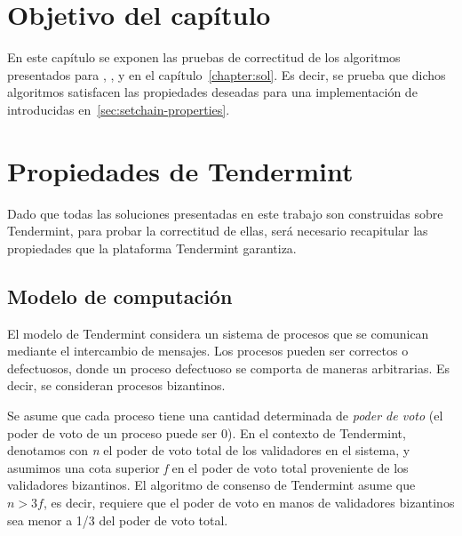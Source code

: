 \section{Objetivo del capítulo}
En este capítulo se exponen las pruebas de correctitud de los algoritmos presentados para
\vanilla, \compresschain, y \hashchain en el capítulo~\ref{chapter:sol}.
Es decir, se prueba que dichos algoritmos satisfacen las propiedades deseadas para una
implementación de \setchain introducidas en~\ref{sec:setchain-properties}.

\section{Propiedades de Tendermint}\label{sec:properties}
Dado que todas las soluciones presentadas en este trabajo son construidas sobre Tendermint,
para probar la correctitud de ellas, será necesario recapitular las propiedades que la
plataforma Tendermint garantiza.

\subsection{Modelo de computación}
El modelo de Tendermint considera un sistema de procesos que se comunican mediante el intercambio de
mensajes.
Los procesos pueden ser correctos o defectuosos, donde un proceso defectuoso se comporta de maneras
arbitrarias. Es decir, se consideran procesos bizantinos.

Se asume que cada proceso tiene una cantidad determinada de \textit{poder de voto} (el poder de
voto de un proceso puede ser 0).
%
En el contexto de Tendermint, denotamos con \textit{n} el poder de voto total de los validadores
en el sistema, y asumimos una cota superior \textit{f} en el poder de voto total proveniente de
los validadores bizantinos.
%
El algoritmo de consenso de Tendermint asume que $n > 3f$, es decir, requiere que el poder de voto
en manos de validadores bizantinos sea menor a 1/3 del poder de voto total.

